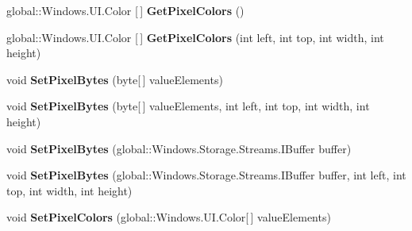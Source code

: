 \begin{DoxyCompactItemize}
global\+::\+Windows.\+U\+I.\+Color \mbox{[}$\,$\mbox{]} {\bfseries Get\+Pixel\+Colors} ()
\item 
\mbox{\label{interface_microsoft_1_1_graphics_1_1_canvas_1_1_i_canvas_bitmap_ac162dc28f7d3a5de4034936d417c24e5}} 
global\+::\+Windows.\+U\+I.\+Color \mbox{[}$\,$\mbox{]} {\bfseries Get\+Pixel\+Colors} (int left, int top, int width, int height)
\item 
\mbox{\label{interface_microsoft_1_1_graphics_1_1_canvas_1_1_i_canvas_bitmap_a811bec820a040dca5292270d03b6431f}} 
void {\bfseries Set\+Pixel\+Bytes} (byte\mbox{[}$\,$\mbox{]} value\+Elements)
\item 
\mbox{\label{interface_microsoft_1_1_graphics_1_1_canvas_1_1_i_canvas_bitmap_af373b13151ccbea6a489af0b71c86b6d}} 
void {\bfseries Set\+Pixel\+Bytes} (byte\mbox{[}$\,$\mbox{]} value\+Elements, int left, int top, int width, int height)
\item 
\mbox{\label{interface_microsoft_1_1_graphics_1_1_canvas_1_1_i_canvas_bitmap_a21c32cb7fb31c8fd6a1decdcb79876d2}} 
void {\bfseries Set\+Pixel\+Bytes} (global\+::\+Windows.\+Storage.\+Streams.\+I\+Buffer buffer)
\item 
\mbox{\label{interface_microsoft_1_1_graphics_1_1_canvas_1_1_i_canvas_bitmap_a593c5894545aa39d6cf008b46bef4972}} 
void {\bfseries Set\+Pixel\+Bytes} (global\+::\+Windows.\+Storage.\+Streams.\+I\+Buffer buffer, int left, int top, int width, int height)
\item 
\mbox{\label{interface_microsoft_1_1_graphics_1_1_canvas_1_1_i_canvas_bitmap_a925c9f849cf70be981d86d4e4aad1bd0}} 
void {\bfseries Set\+Pixel\+Colors} (global\+::\+Windows.\+U\+I.\+Color\mbox{[}$\,$\mbox{]} value\+Elements)
\item 
\mbox{\label{interface_microsoft_1_1_graphics_1_1_canvas_1_1_i_canvas_bitmap_ad139947e5dfa06e8b880c01a19016cf7}} 

\end{DoxyCompactItemize}
